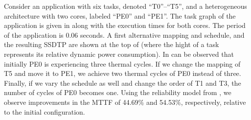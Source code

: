 Consider an application with six tasks, denoted ``T0''--``T5'', and a heterogeneous architecture with two cores, labeled ``PE0'' and ``PE1''. The task graph of the application is given in  along with the execution times for both cores. The period of the application is 0.06 seconds. A first alternative mapping and schedule, and the resulting SSDTP are shown at the top of  (where the hight of a task represents its relative dynamic power consumption). In can be observed that initially PE0 is experiencing three thermal cycles. If we change the mapping of T5 and move it to PE1, we achieve two thermal cycles of PE0 instead of three. Finally, if we vary the schedule as well and change the order of T1 and T3, the number of cycles of PE0 becomes one. Using the reliability model from , we observe improvements in the MTTF of 44.69\% and 54.53\%, respectively, relative to the initial configuration.
